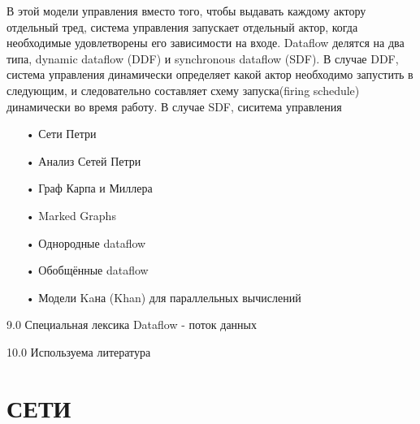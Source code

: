 \documentclass[a4paper,14pt]{article}
\begin{document}
В этой модели управления вместо того, чтобы выдавать каждому актору отдельный тред, система управления запускает отдельный актор, когда необходимые удовлетворены его зависимости на входе.  Dataflow делятся на два типа, dynamic dataflow (DDF) и synchronous dataflow (SDF). В случае DDF, система управления динамически определяет  какой актор необходимо запустить в следующим, и следовательно составляет схему запуска(firing schedule) динамически во время работу. В случае SDF, сиситема управления 
\begin{enumerate}
\item[•] Сети Петри
\item[•] Анализ Сетей Петри
\item[•] Граф Карпа и Миллера 
\item[•] Marked Graphs
\item[•] Однородные dataflow
\item[•] Обобщённые dataflow
\item[•] Модели Kaна (Khan) для параллельных вычислений
\end{enumerate}

9.0  Специальная лексика
 Dataflow - поток данных 


10.0 Используема литература

\section{СЕТИ}
\end{document}
